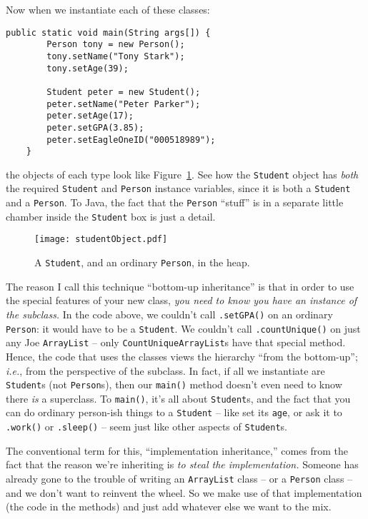 \begin{samepage}
Now when we instantiate each of these classes:

\begin{Verbatim}[fontsize=\footnotesize,samepage=true,frame=single]
    public static void main(String args[]) {
        Person tony = new Person();
        tony.setName("Tony Stark");
        tony.setAge(39);

        Student peter = new Student();
        peter.setName("Peter Parker");
        peter.setAge(17);
        peter.setGPA(3.85);
        peter.setEagleOneID("000518989");
    }
\end{Verbatim}
\end{samepage}

the objects of each type look like Figure~\ref{fig:studentObject}. See how the
\texttt{Student} object has \textit{both} the required \texttt{Student} and
\texttt{Person} instance variables, since it is both a \texttt{Student} and a
\texttt{Person}. To Java, the fact that the \texttt{Person} ``stuff'' is in a
separate little chamber inside the \texttt{Student} box is just a detail.

\begin{figure}
\centering
\texttt{[image: studentObject.pdf]}
\caption{A \texttt{Student}, and an ordinary \texttt{Person}, in the heap.}
\label{fig:studentObject}
\end{figure}

The reason I call this technique ``bottom-up inheritance'' is that in order to
use the special features of your new class, \textit{you need to know you have
an instance of the subclass.} In the code above, we couldn't call
\texttt{.setGPA()} on an ordinary \texttt{Person}: it would have to be a
\texttt{Student}. We couldn't call \texttt{.countUnique()} on just any Joe
\texttt{ArrayList} -- only \texttt{CountUniqueArrayList}s have that special
method. Hence, the code that uses the classes views the hierarchy ``from the
bottom-up''; \textit{i.e.}, from the perspective of the subclass. In fact, if
all we instantiate are \texttt{Student}s (not \texttt{Person}s), then our
\texttt{main()} method doesn't even need to know there \textit{is} a
superclass. To \texttt{main()}, it's all about \texttt{Student}s, and the fact
that you can do ordinary person-ish things to a \texttt{Student} -- like set
its \texttt{age}, or ask it to \texttt{.work()} or \texttt{.sleep()} -- seem
just like other aspects of \texttt{Student}s.

The conventional term for this, ``implementation inheritance,'' comes from the
fact that the reason we're inheriting is \textit{to steal the implementation.}
Someone has already gone to the trouble of writing an \texttt{ArrayList} class
-- or a \texttt{Person} class -- and we don't want to reinvent the wheel. So
we make use of that implementation (the code in the methods) and just add
whatever else we want to the mix.


